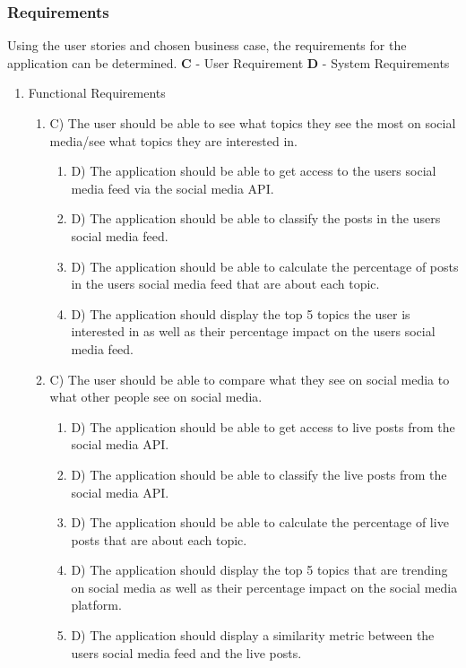 \subsubsection{Requirements}
Using the user stories and chosen business case, the requirements for the application can be determined. \textbf{C} - User Requirement
\textbf{D} - System Requirements
\begin{enumerate}
    \item Functional Requirements
    \begin{enumerate}
        \item C) The user should be able to see what topics they see the most on social media/see what topics they are interested in.
        \begin{enumerate}
            \item D) The application should be able to get access to the users social media feed via the social media API.
            \item D) The application should be able to classify the posts in the users social media feed.
            \item D) The application should be able to calculate the percentage of posts in the users social media feed that are about each topic.
            \item D) The application should display the top 5 topics the user is interested in as well as their percentage impact on the users social media feed.
        \end{enumerate}
        \item C) The user should be able to compare what they see on social media to what other people see on social media.
        \begin{enumerate}
            \item D) The application should be able to get access to live posts from the social media API.
            \item D) The application should be able to classify the live posts from the social media API.
            \item D) The application should be able to calculate the percentage of live posts that are about each topic.
            \item D) The application should display the top 5 topics that are trending on social media as well as their percentage impact on the social media platform.
            \item D) The application should display a similarity metric between the users social media feed and the live posts.

\end{enumerate}
\end{enumerate}
\end{enumerate}
